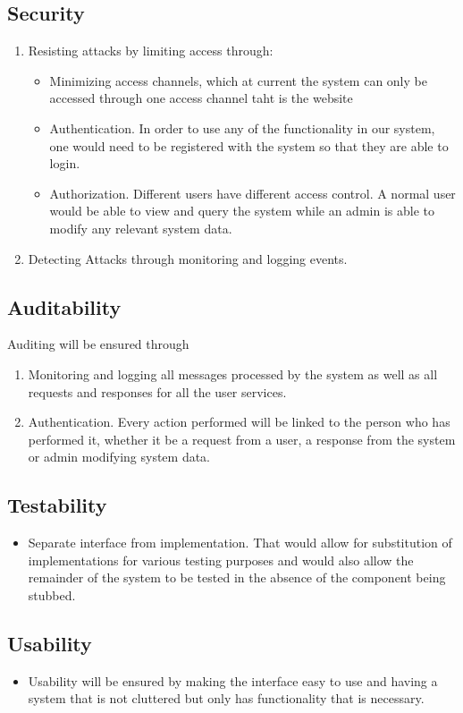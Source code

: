 \subsection{Security}
	\begin{enumerate}
		\item Resisting attacks by limiting access through:
			\begin{itemize}
				\item Minimizing access channels, which at current the system can only be accessed through one access channel taht is the website
				\item Authentication. In order to use any of the functionality in our system, one would need to be registered with the system so that they are able to login.
				\item Authorization. Different users have different access control. A normal user would be able to view and query the system while an admin is able to modify any relevant system data.
			\end{itemize}
		\item Detecting Attacks through monitoring and logging events. 
	\end{enumerate}
	
\subsection{Auditability}
	Auditing will be ensured through
	\begin{enumerate}
		\item Monitoring and logging all messages processed by the system as well as all requests and responses for all the user services.  
		\item Authentication. Every action performed will be linked to the person who has performed it, whether it be a request from a user, a response from the system or admin modifying system data.    
	\end{enumerate}
	
\subsection{Testability}
	\begin{itemize}
		\item Separate interface from implementation. That would allow for substitution of implementations for various testing purposes and would also allow the remainder of the system to be tested in the absence of the component being stubbed.
	\end{itemize}
	
\subsection{Usability}
	\begin{itemize}
		\item Usability will be ensured by making the interface easy to use and having a system that is not cluttered but only has functionality that is necessary.
	\end{itemize}